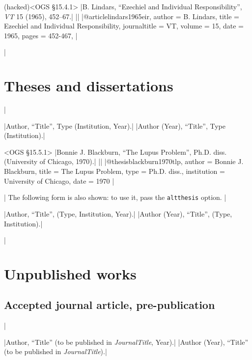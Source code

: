 \documentclass[extrafontsizes,11pt,a4paper,oneside]{memoir}
\newcommand*{\lit}[1]{\textsf{#1}}
\begin{document}
\bibexample(hacked)<OGS \S15.4.1>
|B. Lindars, \enquote{Ezechiel and Individual Responsibility}, \emph{VT} 15 (1965), 452--67.|%
||%
|@article{lindars1965eir,
  author = {B. Lindars},
  title = {Ezechiel and Individual Responsibility},
  journaltitle = {VT\nopunct},
  volume = {15},
  date = {1965},
  pages = {452-467},
}|

\todoc|
\chapter{Theses and dissertations}\label{sec:thesis}
|

\specs
|Author, \enquote{Title}, Type (Institution, Year).|%
|Author (Year), \enquote{Title}, Type (Institution).|

\bibexample<OGS \S15.5.1>
|Bonnie J. Blackburn, \enquote{The Lupus Problem}, Ph.D. diss. (University of Chicago, 1970).|%
||%
|@thesis{blackburn1970tlp,
  author = {Bonnie J. Blackburn},
  title = {The Lupus Problem},
  type = {Ph.D. diss.},
  institution = {University of Chicago},
  date = {1970}
}|

\todoc|
The following form is also shown: to use it, pass the \texttt{altthesis} option.
|

\specs
|Author, \enquote{Title}, (Type, Institution, Year).|%
|Author (Year), \enquote{Title}, (Type, Institution).|


\todoc|
\chapter{Unpublished works}\label{sec:unpublished}

\section{Accepted journal article, pre-publication}
|

\specs
|Author, \enquote{Title} (\lit{to be published in} \emph{JournalTitle}, Year).|%
|Author (Year), \enquote{Title} (\lit{to be published in} \emph{JournalTitle}).|
\end{document}
